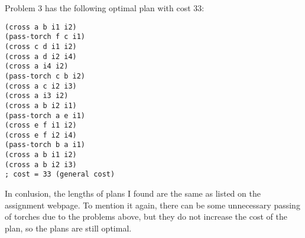 \documentclass[a4paper,11pt]{article}
\begin{document}
Problem 3 has the following optimal plan with cost 33:
\begin{verbatim}
(cross a b i1 i2)
(pass-torch f c i1)
(cross c d i1 i2)
(cross a d i2 i4)
(cross a i4 i2)
(pass-torch c b i2)
(cross a c i2 i3)
(cross a i3 i2)
(cross a b i2 i1)
(pass-torch a e i1)
(cross e f i1 i2)
(cross e f i2 i4)
(pass-torch b a i1)
(cross a b i1 i2)
(cross a b i2 i3)
; cost = 33 (general cost)
\end{verbatim}

In conlusion, the lengths of plans I found are the same as listed on the assignment webpage.
To mention it again, there can be some unnecessary passing of torches due to the problems above, but they do not increase the cost of the plan, so the plans are still optimal.
\end{document}
